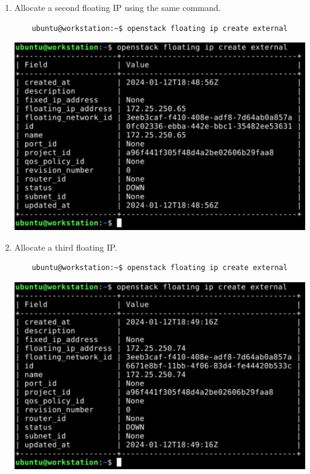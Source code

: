 \documentclass[letterpaper, 12pt]{article}
\begin{document}
\begin{enumerate}
    \item Allocate a second floating IP using the same command.
    \begin{lstlisting}
    ubuntu@workstation:~$ openstack floating ip create external
    \end{lstlisting}

    \begin{center}
        \includegraphics[width=\linewidth]{images/part3/step13.png}
    \end{center}

    \item Allocate a third floating IP.
    \begin{lstlisting}
    ubuntu@workstation:~$ openstack floating ip create external
    \end{lstlisting}

    \begin{center}
        \includegraphics[width=\linewidth]{images/part3/step14.png}
    \end{center}


\end{enumerate}
\end{document}
